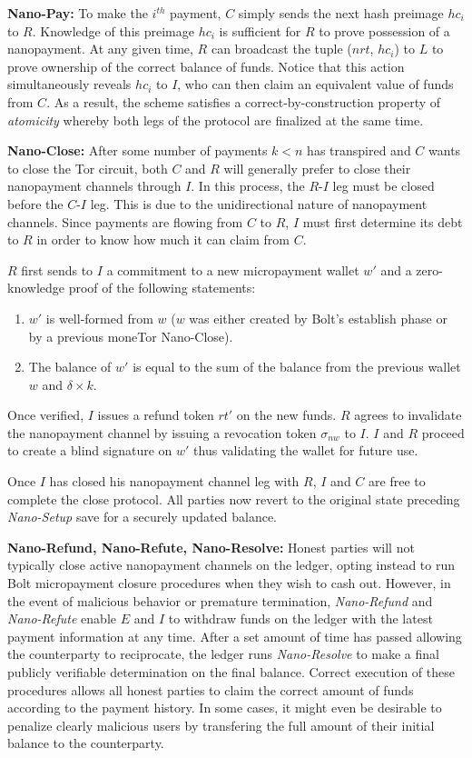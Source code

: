 \medskip \noindent\textbf{Nano-Pay:} To make the $i^{th}$ payment, $C$ simply sends the next hash preimage $hc_i$ to $R$.
Knowledge of this preimage $hc_i$ is sufficient for $R$ to prove possession of a nanopayment.
At any given time, $R$ can broadcast the tuple ($nrt$, $hc_i$) to $L$ to prove ownership of the correct balance of funds.
Notice that this action simultaneously reveals $hc_i$ to $I$, who can then claim an equivalent value of funds from $C$.
As a result, the scheme satisfies a correct-by-construction property of \emph{atomicity} whereby both legs of the protocol are finalized at the same time.

\medskip \noindent\textbf{Nano-Close:} After some number of payments $k < n$ has transpired and $C$ wants to close the Tor circuit, both $C$ and $R$ will generally prefer to close their nanopayment channels through $I$.
In this process, the $R$-$I$ leg must be closed before the $C$-$I$ leg.
This is due to the unidirectional nature of nanopayment channels.
Since payments are flowing from $C$ to $R$, $I$ must first determine its debt to $R$ in order to know how much it can claim from $C$.

$R$ first sends to $I$ a commitment to a new micropayment wallet $w'$ and a zero-knowledge proof of the following statements:

\begin{enumerate}
\item $w'$ is well-formed from $w$ ($w$ was either created by Bolt's establish phase or by a previous moneTor Nano-Close).
\item The balance of $w'$ is equal to the sum of the balance from the previous wallet $w$ and $\delta \times k$.
\end{enumerate}

Once verified, $I$ issues a refund token $rt'$ on the new funds.
$R$ agrees to invalidate the nanopayment channel by issuing a revocation token $\sigma_{nw}$ to $I$.
$I$ and $R$ proceed to create a blind signature on $w'$ thus validating the wallet for future use.

Once $I$ has closed his nanopayment channel leg with $R$, $I$ and $C$ are free to complete the close protocol.
All parties now revert to the original state preceding \emph{Nano-Setup} save for a securely updated balance.

\medskip \noindent\textbf{Nano-Refund, Nano-Refute, Nano-Resolve:} Honest parties will not typically close active nanopayment channels on the ledger, opting instead to run Bolt micropayment closure procedures when they wish to cash out.
However, in the event of malicious behavior or premature termination, \emph{Nano-Refund} and \emph{Nano-Refute} enable $E$ and $I$ to withdraw funds on the ledger with the latest payment information at any time.
After a set amount of time has passed allowing the counterparty to reciprocate, the ledger runs \emph{Nano-Resolve} to make a final publicly verifiable determination on the final balance.
Correct execution of these procedures allows all honest parties to claim the correct amount of funds according to the payment history.
In some cases, it might even be desirable to penalize clearly malicious users by transfering the full amount of their initial balance to the counterparty.

